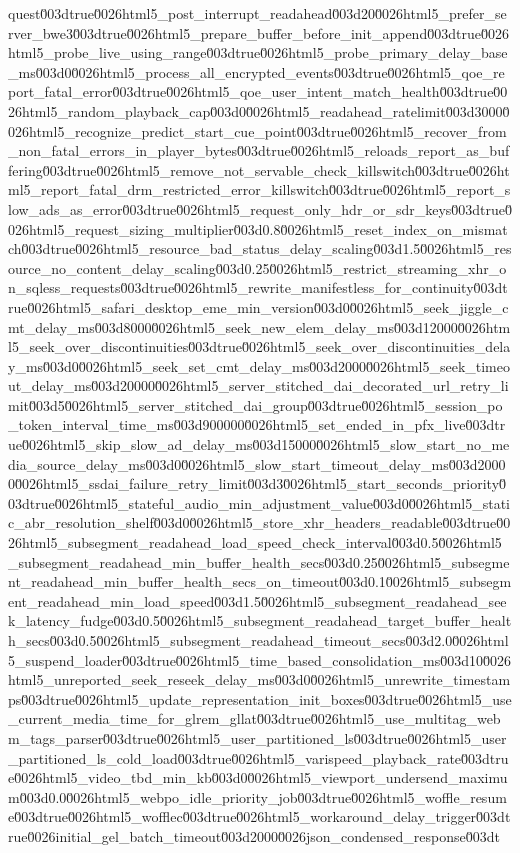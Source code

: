 {quest\u003dtrue\u0026html5_post_interrupt_readahead\u003d20\u0026html5_prefer_server_bwe3\u003dtrue\u0026html5_prepare_buffer_before_init_append\u003dtrue\u0026html5_probe_live_using_range\u003dtrue\u0026html5_probe_primary_delay_base_ms\u003d0\u0026html5_process_all_encrypted_events\u003dtrue\u0026html5_qoe_report_fatal_error\u003dtrue\u0026html5_qoe_user_intent_match_health\u003dtrue\u0026html5_random_playback_cap\u003d0\u0026html5_readahead_ratelimit\u003d3000\u0026html5_recognize_predict_start_cue_point\u003dtrue\u0026html5_recover_from_non_fatal_errors_in_player_bytes\u003dtrue\u0026html5_reloads_report_as_buffering\u003dtrue\u0026html5_remove_not_servable_check_killswitch\u003dtrue\u0026html5_report_fatal_drm_restricted_error_killswitch\u003dtrue\u0026html5_report_slow_ads_as_error\u003dtrue\u0026html5_request_only_hdr_or_sdr_keys\u003dtrue\u0026html5_request_sizing_multiplier\u003d0.8\u0026html5_reset_index_on_mismatch\u003dtrue\u0026html5_resource_bad_status_delay_scaling\u003d1.5\u0026html5_resource_no_content_delay_scaling\u003d0.25\u0026html5_restrict_streaming_xhr_on_sqless_requests\u003dtrue\u0026html5_rewrite_manifestless_for_continuity\u003dtrue\u0026html5_safari_desktop_eme_min_version\u003d0\u0026html5_seek_jiggle_cmt_delay_ms\u003d8000\u0026html5_seek_new_elem_delay_ms\u003d12000\u0026html5_seek_over_discontinuities\u003dtrue\u0026html5_seek_over_discontinuities_delay_ms\u003d0\u0026html5_seek_set_cmt_delay_ms\u003d2000\u0026html5_seek_timeout_delay_ms\u003d20000\u0026html5_server_stitched_dai_decorated_url_retry_limit\u003d5\u0026html5_server_stitched_dai_group\u003dtrue\u0026html5_session_po_token_interval_time_ms\u003d900000\u0026html5_set_ended_in_pfx_live\u003dtrue\u0026html5_skip_slow_ad_delay_ms\u003d15000\u0026html5_slow_start_no_media_source_delay_ms\u003d0\u0026html5_slow_start_timeout_delay_ms\u003d20000\u0026html5_ssdai_failure_retry_limit\u003d3\u0026html5_start_seconds_priority\u003dtrue\u0026html5_stateful_audio_min_adjustment_value\u003d0\u0026html5_static_abr_resolution_shelf\u003d0\u0026html5_store_xhr_headers_readable\u003dtrue\u0026html5_subsegment_readahead_load_speed_check_interval\u003d0.5\u0026html5_subsegment_readahead_min_buffer_health_secs\u003d0.25\u0026html5_subsegment_readahead_min_buffer_health_secs_on_timeout\u003d0.1\u0026html5_subsegment_readahead_min_load_speed\u003d1.5\u0026html5_subsegment_readahead_seek_latency_fudge\u003d0.5\u0026html5_subsegment_readahead_target_buffer_health_secs\u003d0.5\u0026html5_subsegment_readahead_timeout_secs\u003d2.0\u0026html5_suspend_loader\u003dtrue\u0026html5_time_based_consolidation_ms\u003d10\u0026html5_unreported_seek_reseek_delay_ms\u003d0\u0026html5_unrewrite_timestamps\u003dtrue\u0026html5_update_representation_init_boxes\u003dtrue\u0026html5_use_current_media_time_for_glrem_gllat\u003dtrue\u0026html5_use_multitag_webm_tags_parser\u003dtrue\u0026html5_user_partitioned_ls\u003dtrue\u0026html5_user_partitioned_ls_cold_load\u003dtrue\u0026html5_varispeed_playback_rate\u003dtrue\u0026html5_video_tbd_min_kb\u003d0\u0026html5_viewport_undersend_maximum\u003d0.0\u0026html5_webpo_idle_priority_job\u003dtrue\u0026html5_woffle_resume\u003dtrue\u0026html5_wofflec\u003dtrue\u0026html5_workaround_delay_trigger\u003dtrue\u0026initial_gel_batch_timeout\u003d2000\u0026json_condensed_response\u003dt}
